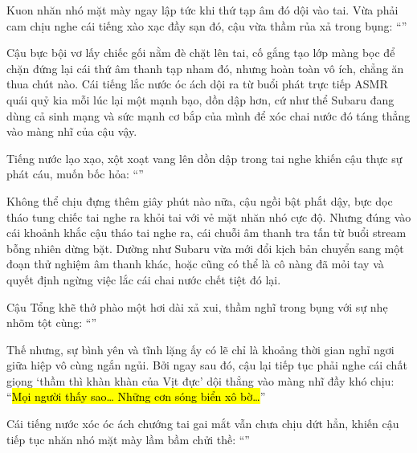 \documentclass[../main.tex]{subfiles}
\begin{document}

\il

Kuon nhăn nhó mặt mày ngay lập tức khi thứ tạp âm đó dội vào tai. Vừa phải cam chịu nghe cái tiếng xào xạc đầy sạn đó, cậu vừa thầm rủa xả trong bụng: ``\textit{}''

Cậu bực bội vơ lấy chiếc gối nằm đè chặt lên tai, cố gắng tạo lớp màng bọc để chặn đứng lại cái thứ âm thanh tạp nham đó, nhưng hoàn toàn vô ích, chẳng ăn thua chút nào. Cái tiếng lắc nước óc ách dội ra từ buổi phát trực tiếp ASMR quái quỷ kia mỗi lúc lại một mạnh bạo, dồn dập hơn, cứ như thể Subaru đang dùng cả sinh mạng và sức mạnh cơ bắp của mình để xóc chai nước đó táng thẳng vào màng nhĩ của cậu vậy.

Tiếng nước lạo xạo, xột xoạt vang lên dồn dập trong tai nghe khiến cậu thực sự phát cáu, muốn bốc hỏa: ``\textit{}''

Không thể chịu đựng thêm giây phút nào nữa, cậu ngồi bật phắt dậy, bực dọc tháo tung chiếc tai nghe ra khỏi tai với vẻ mặt nhăn nhó cực độ. Nhưng đúng vào cái khoảnh khắc cậu tháo tai nghe ra, cái chuỗi âm thanh tra tấn từ buổi stream bỗng nhiên dừng bặt. Dường như Subaru vừa mới đổi kịch bản chuyển sang một đoạn thử nghiệm âm thanh khác, hoặc cũng có thể là cô nàng đã mỏi tay và quyết định ngừng việc lắc cái chai nước chết tiệt đó lại.

Cậu Tổng khẽ thở phào một hơi dài xả xui, thầm nghĩ trong bụng với sự nhẹ nhõm tột cùng: ``\textit{}''

Thế nhưng, sự bình yên và tĩnh lặng ấy có lẽ chỉ là khoảng thời gian nghỉ ngơi giữa hiệp vô cùng ngắn ngủi. Bởi ngay sau đó, cậu lại tiếp tục phải nghe cái chất giọng `thầm thì khàn khàn của Vịt đực' dội thẳng vào màng nhĩ đầy khó chịu: ``\hl{Mọi người thấy sao\dots{} Những cơn sóng biển xô bờ\dots}''

Cái tiếng nước xóc óc ách chướng tai gai mắt vẫn chưa chịu dứt hẳn, khiến cậu tiếp tục nhăn nhó mặt mày lầm bầm chửi thề: ``\textit{}''
\end{document}
